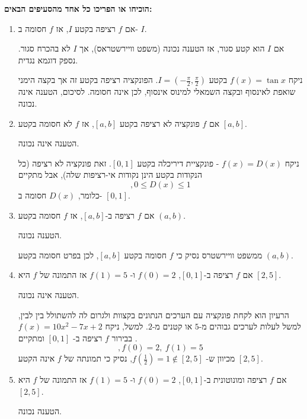 \textbf{
הוכיחו או הפריכו
כל אחד מהסעיפים הבאים:}
\begin{enumerate}
    \item אם
    $f$
    רציפה
    בקטע
    $I$,
    אז
    $f$
    חסומה ב-
    $I$.
\begin{solbox}
אם
$I$
הוא קטע סגור, אז הטענה נכונה
(משפט וויירשטראס),
אך
$I$
לא בהכרח סגור. נספק דוגמא נגדית.

ניקח
$f(x)=\tan x$
בקטע
$I=(-\tfrac{\pi}{2},\tfrac{\pi}{2})$.
הפונקציה רציפה בקטע זה אך בקצה הימני שואפת לאינסוף ובקצה השמאלי למינוס אינסוף,
לכן אינה חסומה. לסיכום,
הטענה אינה נכונה.
\end{solbox}
    \item
    אם
    $f$
    פונקציה לא רציפה
    בקטע
    $[a,b]$, אז
    $f$
    לא חסומה בקטע $[a,b]$.
\begin{solbox}
הטענה אינה נכונה.

ניקח
$f(x)=D(x)$ -
פונקציית דיריכלה
בקטע
$[0,1]$.
זאת פונקציה לא רציפה
(כל הנקודות בקטע הינן נקודות אי-רציפות שלה),
אבל
מתקיים
$$,0\leq D(x)\leq 1$$
כלומר,
$D(x)$
חסומה ב-
$[0,1]$.
\end{solbox}
    \item
    אם
    $f$
    רציפה ב-$[a,b]$, אז
    $f$
    חסומה בקטע $(a,b)$.
\begin{solbox}
הטענה נכונה.

ממשפט וויירשטרס נסיק כי
$f$
חסומה בקטע
$[a,b]$,
לכן בפרט חסומה בקטע
$(a,b)$.
\end{solbox}
    \item
    אם
    $f$
    רציפה ב-$[0,1]$,
    $f(0)=2$ ו- $f(1)=5$ אז התמונה של $f$ היא $[2,5]$.
\begin{solbox}
הטענה אינה נכונה.

הרעיון הוא לקחת פונקציה עם הערכים הנתונים בקצוות ולגרום לה להשתולל בין לבין, למשל לעלות לערכים גבוהים מ-$5$
או קטנים מ-$2$.
למשל,
ניקח
$f(x)=10x^2-7x+2$.
בבירור
$f$
רציפה ב-
$[0,1]$
ומתקיים
$$,f(0)=2,\ f(1)=5$$
מכיוון ש-
$f(\tfrac{1}{2})=1\notin[2,5]$,
נסיק כי תמונתה של
$f$
אינה הקטע
$[2,5]$.
\end{solbox}
    \item
    אם
    $f$
    רציפה ומונוטונית ב-$[0,1]$, $f(0)=2$ ו- $f(1)=5$ אז התמונה של $f$ היא $[2,5]$.
\begin{solbox}
הטענה נכונה.


\end{solbox}
\end{enumerate}
